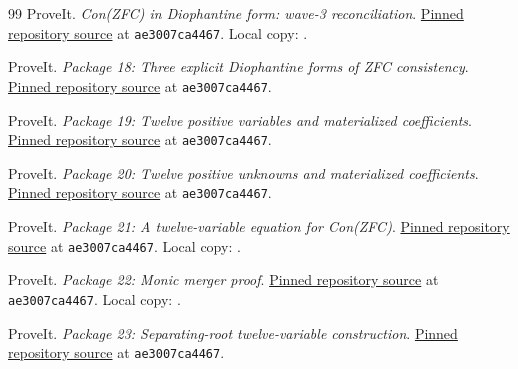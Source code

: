 \clearpage
\begin{thebibliography}{99}
ProveIt. \emph{Con(ZFC) in Diophantine form: wave-3 reconciliation}.
\href{https://github.com/VladimirReshetnikov/ProveIt/blob/ae3007ca4467011e0e051c84acb4a1dd13971b0e/SetTheory/Cardinals/docs/reports/hilbert-tenth-problem/con-zfc-diophantine-forms/README.md}{Pinned repository source} at \texttt{ae3007ca4467}. Local copy: .

ProveIt. \emph{Package 18: Three explicit Diophantine forms of ZFC consistency}.
\href{https://github.com/VladimirReshetnikov/ProveIt/blob/ae3007ca4467011e0e051c84acb4a1dd13971b0e/SetTheory/Cardinals/docs/reports/hilbert-tenth-problem/con-zfc-diophantine-forms/18-jones9/README.md}{Pinned repository source} at \texttt{ae3007ca4467}.

ProveIt. \emph{Package 19: Twelve positive variables and materialized coefficients}.
\href{https://github.com/VladimirReshetnikov/ProveIt/blob/ae3007ca4467011e0e051c84acb4a1dd13971b0e/SetTheory/Cardinals/docs/reports/hilbert-tenth-problem/con-zfc-diophantine-forms/19-wang943/README.md}{Pinned repository source} at \texttt{ae3007ca4467}.

ProveIt. \emph{Package 20: Twelve positive unknowns and materialized coefficients}.
\href{https://github.com/VladimirReshetnikov/ProveIt/blob/ae3007ca4467011e0e051c84acb4a1dd13971b0e/SetTheory/Cardinals/docs/reports/hilbert-tenth-problem/con-zfc-diophantine-forms/20-root12/README.md}{Pinned repository source} at \texttt{ae3007ca4467}.

ProveIt. \emph{Package 21: A twelve-variable equation for Con(ZFC)}.
\href{https://github.com/VladimirReshetnikov/ProveIt/blob/ae3007ca4467011e0e051c84acb4a1dd13971b0e/SetTheory/Cardinals/docs/reports/hilbert-tenth-problem/con-zfc-diophantine-forms/21-norm12/proofs/NORM12_PROOF.md}{Pinned repository source} at \texttt{ae3007ca4467}. Local copy: .

ProveIt. \emph{Package 22: Monic merger proof}.
\href{https://github.com/VladimirReshetnikov/ProveIt/blob/ae3007ca4467011e0e051c84acb4a1dd13971b0e/SetTheory/Cardinals/docs/reports/hilbert-tenth-problem/con-zfc-diophantine-forms/22-monic12/proofs/merger_proof.md}{Pinned repository source} at \texttt{ae3007ca4467}. Local copy: .

ProveIt. \emph{Package 23: Separating-root twelve-variable construction}.
\href{https://github.com/VladimirReshetnikov/ProveIt/blob/ae3007ca4467011e0e051c84acb4a1dd13971b0e/SetTheory/Cardinals/docs/reports/hilbert-tenth-problem/con-zfc-diophantine-forms/23-separating12/README.md}{Pinned repository source} at \texttt{ae3007ca4467}.


\end{thebibliography}
